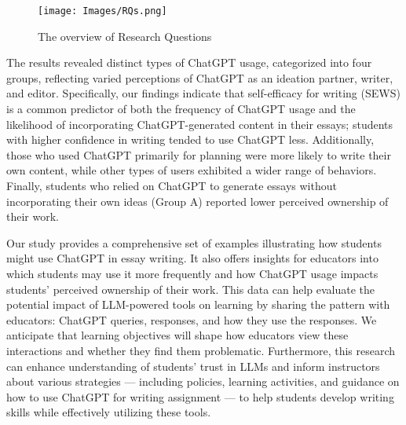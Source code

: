 \documentclass[manuscript,screen,acmsmall]{acmart}
\begin{document}
\begin{figure}[t!]
    \centering
    \texttt{[image: Images/RQs.png]}
    \caption{The overview of Research Questions}
    \label{fig:rqs}
\end{figure}
The results revealed distinct types of ChatGPT usage, categorized into four groups, reflecting varied perceptions of ChatGPT as an ideation partner, writer, and editor. Specifically, our findings indicate that self-efficacy for writing (SEWS) is a common predictor of both the frequency of ChatGPT usage and the likelihood of incorporating ChatGPT-generated content in their essays; students with higher confidence in writing tended to use ChatGPT less. Additionally, those who used ChatGPT primarily for planning were more likely to write their own content, while other types of users exhibited a wider range of behaviors. Finally, students who relied on ChatGPT to generate essays without incorporating their own ideas (Group A) reported lower perceived ownership of their work. 




Our study provides a comprehensive set of examples illustrating how students might use ChatGPT in essay writing. It also offers insights for educators into which students may use it more frequently and how ChatGPT usage impacts students' perceived ownership of their work. This data can help evaluate the potential impact of LLM-powered tools on learning by sharing the pattern with educators: ChatGPT queries, responses, and how they use the responses. We anticipate that learning objectives will shape how educators view these interactions and whether they find them problematic. Furthermore, this research can enhance understanding of students' trust in LLMs and inform instructors about various strategies --- including policies, learning activities, and guidance on how to use ChatGPT for writing assignment --- to help students develop writing skills while effectively utilizing these tools.
\end{document}
